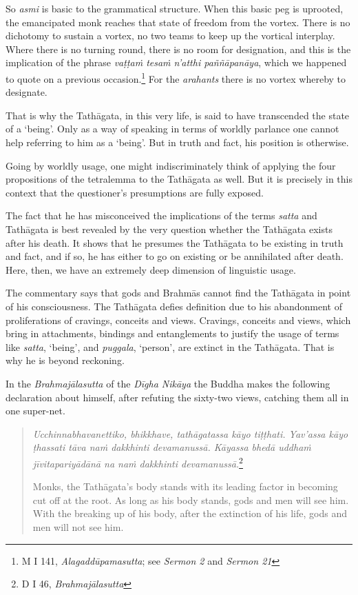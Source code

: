 So \emph{asmi} is basic to the grammatical structure. When this basic peg is uprooted, the emancipated monk reaches that state of freedom from the vortex. There is no dichotomy to sustain a vortex, no two teams to keep up the vortical interplay. Where there is no turning round, there is no room for designation, and this is the implication of the phrase \emph{vaṭṭaṁ tesaṁ n'atthi paññāpanāya}, which we happened to quote on a previous occasion.\footnote{M I 141, \emph{Alagaddūpamasutta}; see \emph{Sermon 2} and \emph{Sermon 21}} For the \emph{arahants} there is no vortex whereby to designate.

That is why the Tathāgata, in this very life, is said to have transcended the state of a `being'. Only as a way of speaking in terms of worldly parlance one cannot help referring to him as a `being'. But in truth and fact, his position is otherwise.

Going by worldly usage, one might indiscriminately think of applying the four propositions of the tetralemma to the Tathāgata as well. But it is precisely in this context that the questioner's presumptions are fully exposed.

The fact that he has misconceived the implications of the terms \emph{satta} and Tathāgata is best revealed by the very question whether the Tathāgata exists after his death. It shows that he presumes the Tathāgata to be existing in truth and fact, and if so, he has either to go on existing or be annihilated after death. Here, then, we have an extremely deep dimension of linguistic usage.

The commentary says that gods and Brahmās cannot find the Tathāgata in point of his consciousness. The Tathāgata defies definition due to his abandonment of proliferations of cravings, conceits and views. Cravings, conceits and views, which bring in attachments, bindings and \mbox{entanglements} to justify the usage of terms like \emph{satta}, `being', and \emph{puggala}, `person', are extinct in the Tathāgata. That is why he is beyond reckoning.

In the \emph{Brahmajālasutta} of the \emph{Dīgha Nikāya} the Buddha makes the following declaration about himself, after refuting the sixty-two views, catching them all in one super-net.

\begin{quote}
\emph{Ucchinnabhavanettiko, bhikkhave, tathāgatassa kāyo tiṭṭhati. Yav'assa kāyo ṭhassati tāva naṁ dakkhinti devamanussā. Kāyassa bhedā uddhaṁ jīvitapariyādānā na naṁ dakkhinti devamanussā.}\footnote{D I 46, \emph{Brahmajālasutta}}

Monks, the Tathāgata's body stands with its leading factor in becoming cut off at the root. As long as his body stands, gods and men will see him. With the breaking up of his body, after the extinction of his life, gods and men will not see him.
\end{quote}


